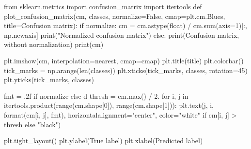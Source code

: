 \documentclass[
  letterpaper,
  DIV=11,
  numbers=noendperiod]{scrartcl}
\newenvironment{Shaded}{\begin{snugshade}}{\end{snugshade}}
\newcommand{\BuiltInTok}[1]{\textcolor[rgb]{0.00,0.23,0.31}{#1}}
\newcommand{\ControlFlowTok}[1]{\textcolor[rgb]{0.00,0.23,0.31}{#1}}
\newcommand{\DecValTok}[1]{\textcolor[rgb]{0.68,0.00,0.00}{#1}}
\newcommand{\FloatTok}[1]{\textcolor[rgb]{0.68,0.00,0.00}{#1}}
\newcommand{\ImportTok}[1]{\textcolor[rgb]{0.00,0.46,0.62}{#1}}
\newcommand{\KeywordTok}[1]{\textcolor[rgb]{0.00,0.23,0.31}{#1}}
\newcommand{\NormalTok}[1]{\textcolor[rgb]{0.00,0.23,0.31}{#1}}
\newcommand{\OperatorTok}[1]{\textcolor[rgb]{0.37,0.37,0.37}{#1}}
\newcommand{\StringTok}[1]{\textcolor[rgb]{0.13,0.47,0.30}{#1}}
\newcommand{\VariableTok}[1]{\textcolor[rgb]{0.07,0.07,0.07}{#1}}
\begin{document}
\begin{Shaded}
\begin{Highlighting}[]
\ImportTok{from}\NormalTok{ sklearn.metrics }\ImportTok{import}\NormalTok{ confusion\_matrix}
\ImportTok{import}\NormalTok{ itertools}
\KeywordTok{def}\NormalTok{ plot\_confusion\_matrix(cm, classes, normalize}\OperatorTok{=}\VariableTok{False}\NormalTok{, cmap}\OperatorTok{=}\NormalTok{plt.cm.Blues, title}\OperatorTok{=}\StringTok{\textquotesingle{}Confusion matrix\textquotesingle{}}\NormalTok{):}
    \ControlFlowTok{if}\NormalTok{ normalize:}
\NormalTok{        cm }\OperatorTok{=}\NormalTok{ cm.astype(}\StringTok{\textquotesingle{}float\textquotesingle{}}\NormalTok{) }\OperatorTok{/}\NormalTok{ cm.}\BuiltInTok{sum}\NormalTok{(axis}\OperatorTok{=}\DecValTok{1}\NormalTok{)[:, np.newaxis]}
        \BuiltInTok{print}\NormalTok{(}\StringTok{"Normalized confusion matrix"}\NormalTok{)}
    \ControlFlowTok{else}\NormalTok{:}
        \BuiltInTok{print}\NormalTok{(}\StringTok{\textquotesingle{}Confusion matrix, without normalization\textquotesingle{}}\NormalTok{)}
    \BuiltInTok{print}\NormalTok{(cm)}

\NormalTok{    plt.imshow(cm, interpolation}\OperatorTok{=}\StringTok{\textquotesingle{}nearest\textquotesingle{}}\NormalTok{, cmap}\OperatorTok{=}\NormalTok{cmap)}
\NormalTok{    plt.title(title)}
\NormalTok{    plt.colorbar()}
\NormalTok{    tick\_marks }\OperatorTok{=}\NormalTok{ np.arange(}\BuiltInTok{len}\NormalTok{(classes))}
\NormalTok{    plt.xticks(tick\_marks, classes, rotation}\OperatorTok{=}\DecValTok{45}\NormalTok{)}
\NormalTok{    plt.yticks(tick\_marks, classes)}

\NormalTok{    fmt }\OperatorTok{=} \StringTok{\textquotesingle{}.2f\textquotesingle{}} \ControlFlowTok{if}\NormalTok{ normalize }\ControlFlowTok{else} \StringTok{\textquotesingle{}d\textquotesingle{}}
\NormalTok{    thresh }\OperatorTok{=}\NormalTok{ cm.}\BuiltInTok{max}\NormalTok{() }\OperatorTok{/} \FloatTok{2.}
    \ControlFlowTok{for}\NormalTok{ i, j }\KeywordTok{in}\NormalTok{ itertools.product(}\BuiltInTok{range}\NormalTok{(cm.shape[}\DecValTok{0}\NormalTok{]), }\BuiltInTok{range}\NormalTok{(cm.shape[}\DecValTok{1}\NormalTok{])):}
\NormalTok{        plt.text(j, i, }\BuiltInTok{format}\NormalTok{(cm[i, j], fmt),}
\NormalTok{                 horizontalalignment}\OperatorTok{=}\StringTok{"center"}\NormalTok{,}
\NormalTok{                 color}\OperatorTok{=}\StringTok{"white"} \ControlFlowTok{if}\NormalTok{ cm[i, j] }\OperatorTok{\textgreater{}}\NormalTok{ thresh }\ControlFlowTok{else} \StringTok{"black"}\NormalTok{)}

\NormalTok{    plt.tight\_layout()}
\NormalTok{    plt.ylabel(}\StringTok{\textquotesingle{}True label\textquotesingle{}}\NormalTok{)}
\NormalTok{    plt.xlabel(}\StringTok{\textquotesingle{}Predicted label\textquotesingle{}}\NormalTok{)}
\end{Highlighting}
\end{Shaded}
\end{document}
